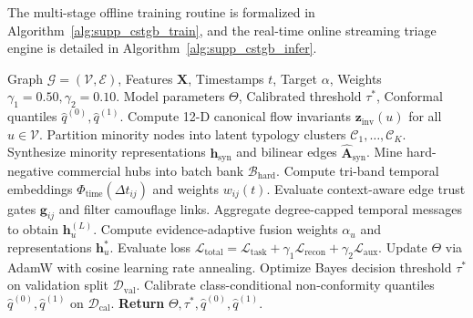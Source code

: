\documentclass[a4paper,fleqn,twocolumn]{article}
\begin{document}
The multi-stage offline training routine is formalized in Algorithm~\ref{alg:supp_cstgb_train}, and the real-time online streaming triage engine is detailed in Algorithm~\ref{alg:supp_cstgb_infer}.

\begin{algorithm}[htbp]
\caption{C-STGB Unified Multi-Stage Training Pipeline}
\label{alg:supp_cstgb_train}
\begin{algorithmic}[1]
\Require Graph $\mathcal{G}=(\mathcal{V}, \mathcal{E})$, Features $\mathbf{X}$, Timestamps $t$, Target $\alpha$, Weights $\gamma_1=0.50, \gamma_2=0.10$.
\Ensure Model parameters $\Theta$, Calibrated threshold $\tau^*$, Conformal quantiles $\hat{q}^{(0)}, \hat{q}^{(1)}$.
\State Compute 12-D canonical flow invariants $\mathbf{z}_{\text{inv}}(u)$ for all $u \in \mathcal{V}$.
\State Partition minority nodes into latent typology clusters $\mathcal{C}_1, \dots, \mathcal{C}_K$.
\State Synthesize minority representations $\mathbf{h}_{\text{syn}}$ and bilinear edges $\hat{\mathbf{A}}_{\text{syn}}$.
\State Mine hard-negative commercial hubs into batch bank $\mathcal{B}_{\text{hard}}$.
    \State Compute tri-band temporal embeddings $\Phi_{\text{time}}(\Delta t_{ij})$ and weights $w_{ij}(t)$.
    \State Evaluate context-aware edge trust gates $\mathbf{g}_{ij}$ and filter camouflage links.
    \State Aggregate degree-capped temporal messages to obtain $\mathbf{h}_u^{(L)}$.
    \State Compute evidence-adaptive fusion weights $\alpha_u$ and representations $\mathbf{h}_u^*$.
    \State Evaluate loss $\mathcal{L}_{\text{total}} = \mathcal{L}_{\text{task}} + \gamma_1 \mathcal{L}_{\text{recon}} + \gamma_2 \mathcal{L}_{\text{aux}}$.
    \State Update $\Theta$ via AdamW with cosine learning rate annealing.
\EndFor
\State Optimize Bayes decision threshold $\tau^*$ on validation split $\mathcal{D}_{\text{val}}$.
\State Calibrate class-conditional non-conformity quantiles $\hat{q}^{(0)}, \hat{q}^{(1)}$ on $\mathcal{D}_{\text{cal}}$.
\State \textbf{Return} $\Theta, \tau^*, \hat{q}^{(0)}, \hat{q}^{(1)}$.
\end{algorithmic}
\end{algorithm}
\end{document}
